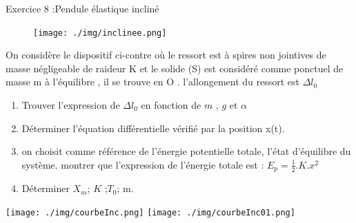 \documentclass[12pt, french]{article}
\begin{document}
\begin{Box2}{Exercice 8 :Pendule élastique incliné}
\begin{figure}

  \begin{center}
	  \vspace{-0.6cm}
	\texttt{[image: ./img/inclinee.png]}
  \end{center}
\end{figure}
On considère le dispositif ci-contre où le ressort est à spires non jointives de masse négligeable de raideur K et le
solide (S) est considéré comme ponctuel de masse m à l’équilibre , il se trouve en O . l’allongement du ressort est
     $\Delta{l_0}$
     \begin{enumerate}
       \item Trouver l’expression de $\Delta{l_0}$ en fonction de $m$ , $g$ et $\alpha$
       \item Déterminer l’équation différentielle vérifié par la position x(t).
       \item on choisit comme référence de l’énergie potentielle totale, l’état d’équilibre du système. montrer que
         l’expression de l’énergie totale est : $E_p = \frac{1}{2}.K.x^2$
       \item Déterminer $X_m$; $K$ ;$T_0$; m.
     \end{enumerate}

  \begin{center}
	\texttt{[image: ./img/courbeInc.png]}
	\texttt{[image: ./img/courbeInc01.png]}
  \end{center}
   \end{Box2}
\end{document}
